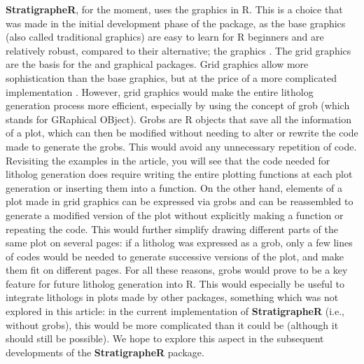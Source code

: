 \textbf{StratigrapheR}, for the moment, uses the  graphics in R. This is a choice that was made in the initial development phase of the package, as the base graphics (also called traditional graphics) are easy to learn for R beginners and are relatively robust, compared to their alternative; the  graphics \citep{murrell_r_2012}. The grid graphics are the basis for the  \citep{sarkar_lattice_2008} and  \citep{wickham_ggplot2_2016} graphical packages. Grid graphics allow more sophistication than the base graphics, but at the price of a more complicated implementation \citep{murrell_r_2012}. However, grid graphics would make the entire litholog generation process more efficient, especially by using the concept of grob (which stands for GRaphical OBject). Grobs are R objects that save all the information of a plot, which can then be modified without needing to alter or rewrite the code made to generate the grobs. This would avoid any unnecessary repetition of code. Revisiting the examples in the article, you will see that the code needed for litholog generation does require writing the entire plotting functions at each plot generation or inserting them into a function. On the other hand, elements of a plot made in grid graphics can be expressed via grobs and can be reassembled to generate a modified version of the plot without explicitly making a function or repeating the code. This would further simplify drawing different parts of the same plot on several pages: if a litholog was expressed as a grob, only a few lines of codes would be needed to generate successive versions of the plot, and make them fit on different pages. For all these reasons, grobs would prove to be a key feature for future litholog generation into R. This would especially be useful to integrate lithologs in plots made by other packages, something which was not explored in this article: in the current implementation of \textbf{StratigrapheR} (i.e., without grobs), this would be more complicated than it could be (although it should still be possible). We hope to explore this aspect in the subsequent developments of the \textbf{StratigrapheR} package.

